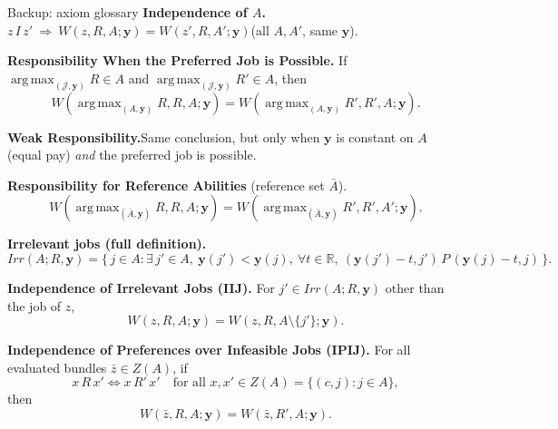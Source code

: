 \documentclass[10pt]{beamer}
\DeclareMathOperator*{\argmax}{arg\,max}
\begin{document}
\begin{frame}[allowframebreaks]{Backup: axiom glossary}
\hypertarget{glossary}{}%
\hyperlink{tab:classification}{}
\footnotesize
\textbf{Independence of $A$.}\quad
$z\,I\,z'\ \Rightarrow\ W(z,R,A;\mathbf y)=W(z',R,A';\mathbf y)$\quad (all $A,A'$, same $\mathbf y$).

\medskip
\textbf{Responsibility When the Preferred Job is Possible.}\quad
If $\argmax_{(\mathcal J,\mathbf y)}R\in A$ and $\argmax_{(\mathcal J,\mathbf y)}R'\in A$, then
\[
W(\argmax_{(A,\mathbf y)}R,R,A;\mathbf y)=W(\argmax_{(A,\mathbf y)}R',R',A;\mathbf y).
\]

\medskip
\textbf{Weak Responsibility.}\quad Same conclusion, but only when $\mathbf y$ is constant
on $A$ (equal pay) \emph{and} the preferred job is possible.

\medskip
\textbf{Responsibility for Reference Abilities} (reference set $\bar A$).\quad
\[
W(\argmax_{(\bar A,\mathbf y)}R,R,A;\mathbf y)=W(\argmax_{(\bar A,\mathbf y)}R',R',A';\mathbf y).
\]

\medskip
\textbf{Irrelevant jobs (full definition).}
{\scriptsize
\[
Irr(A;R,\mathbf y)=\bigl\{\, j\in A : \exists\, j'\in A,\ \mathbf y(j')<\mathbf y(j),\ \forall t\in\mathbb R,\ (\mathbf y(j')-t,j')\,P\,(\mathbf y(j)-t,j)\,\bigr\}.
\]}

\medskip
\textbf{Independence of Irrelevant Jobs (IIJ).}\quad
For $j'\in Irr(A;R,\mathbf y)$ other than the job of $z$,
\[
W(z,R,A;\mathbf y)=W(z,R,A\setminus\{j'\};\mathbf y).
\]

\medskip
\textbf{Independence of Preferences over Infeasible Jobs (IPIJ).}\quad
For all evaluated bundles $\bar z\in Z(A)$, if
\[
x\,R\,x'\Longleftrightarrow x\,R'\,x'
\quad\text{for all }x,x'\in Z(A)=\{(c,j):j\in A\},
\]
then
\[
W(\bar z,R,A;\mathbf y)=W(\bar z,R',A;\mathbf y).
\]
\end{frame}
\end{document}
